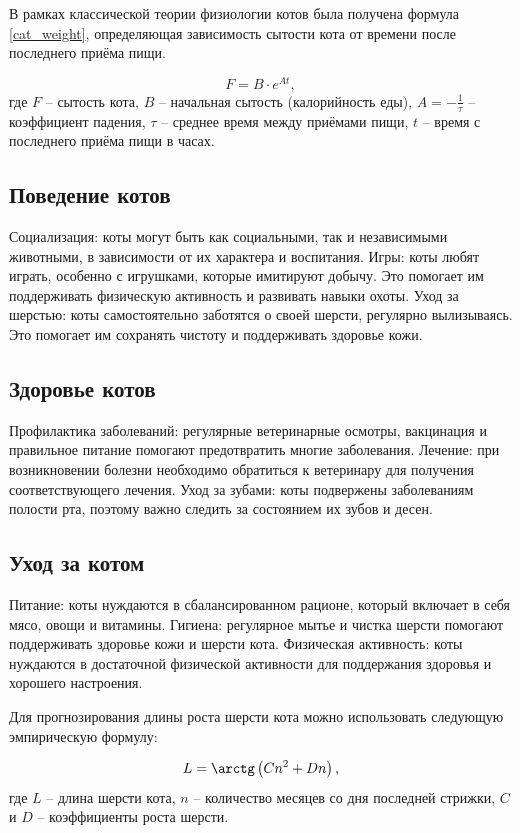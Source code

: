 \documentclass[12pt,a4paper]{article}
\begin{document}
        В рамках классической теории физиологии котов была получена формула \eqref{cat_weight}, определяющая зависимость сытости кота от времени после последнего приёма пищи.
        
\begin{equation}\label{cat_weight}
F = B \cdot e^{At},
\end{equation}
где $F$ -- сытость кота, $B$ -- начальная сытость (калорийность еды), $A = - \frac1\tau$ -- коэффициент падения, $\tau$ -- среднее время между приёмами пищи, $t$ -- время с последнего приёма пищи в часах.
\subsection{Поведение котов}
        Социализация: коты могут быть как социальными, так и независимыми животными, в зависимости от их характера и воспитания.
        Игры: коты любят играть, особенно с игрушками, которые имитируют добычу. Это помогает им поддерживать физическую активность и развивать навыки охоты.
        Уход за шерстью: коты самостоятельно заботятся о своей шерсти, регулярно вылизываясь. Это помогает им сохранять чистоту и поддерживать здоровье кожи.
\subsection{Здоровье котов}
        Профилактика заболеваний: регулярные ветеринарные осмотры, вакцинация и правильное питание помогают предотвратить многие заболевания.
        Лечение: при возникновении болезни необходимо обратиться к ветеринару для получения соответствующего лечения.
        Уход за зубами: коты подвержены заболеваниям полости рта, поэтому важно следить за состоянием их зубов и десен.
\subsection{Уход за котом}
        Питание: коты нуждаются в сбалансированном рационе, который включает в себя мясо, овощи и витамины.
        Гигиена: регулярное мытье и чистка шерсти помогают поддерживать здоровье кожи и шерсти кота.
        Физическая активность: коты нуждаются в достаточной физической активности для поддержания здоровья и хорошего настроения.

Для прогнозирования длины роста шерсти кота можно использовать следующую эмпирическую формулу:

\begin{equation}\label{cat_wool}
L = \arctg\left( Cn^2 + Dn \right),
\end{equation}
где $L$ -- длина шерсти кота, $n$ -- количество месяцев со дня последней стрижки, $C$ и $D$ -- коэффициенты роста шерсти.
\end{document}
